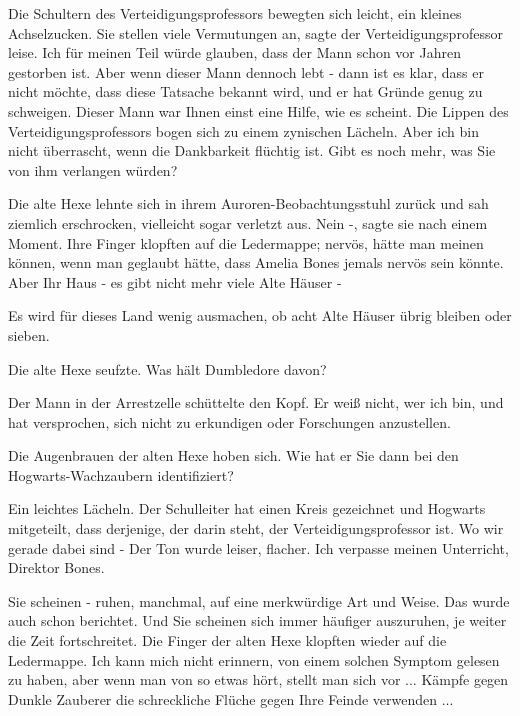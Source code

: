 Die Schultern des Verteidigungsprofessors bewegten sich leicht, ein kleines
Achselzucken. \glqq{}Sie stellen viele Vermutungen an\grqq{}, sagte der
Verteidigungsprofessor leise. \glqq{}Ich für meinen Teil würde glauben, dass der
Mann schon vor Jahren gestorben ist. Aber wenn dieser Mann dennoch lebt - dann
ist es klar, dass er nicht möchte, dass diese Tatsache bekannt wird, und er hat
Gründe genug zu schweigen. Dieser Mann war Ihnen einst eine Hilfe, wie es
scheint.\grqq{} Die Lippen des Verteidigungsprofessors bogen sich zu einem
zynischen Lächeln. \glqq{}Aber ich bin nicht überrascht, wenn die Dankbarkeit
flüchtig ist. Gibt es noch mehr, was Sie von ihm verlangen würden?\grqq{}

Die alte Hexe lehnte sich in ihrem Auroren-Beobachtungsstuhl zurück und sah
ziemlich erschrocken, vielleicht sogar verletzt aus. \glqq{}Nein -\grqq{}, sagte
sie nach einem Moment. Ihre Finger klopften auf die Ledermappe; nervös, hätte
man meinen können, wenn man geglaubt hätte, dass Amelia Bones jemals nervös sein
könnte. \glqq{}Aber Ihr Haus - es gibt nicht mehr viele Alte Häuser -\grqq{}

\glqq{}Es wird für dieses Land wenig ausmachen, ob acht Alte Häuser übrig bleiben
oder sieben.\grqq{}

Die alte Hexe seufzte. \glqq{}Was hält Dumbledore davon?\grqq{}

Der Mann in der Arrestzelle schüttelte den Kopf. \glqq{}Er weiß nicht, wer ich
bin, und hat versprochen, sich nicht zu erkundigen oder Forschungen
anzustellen.\grqq{}

Die Augenbrauen der alten Hexe hoben sich. \glqq{}Wie hat er Sie dann bei den
Hogwarts-Wachzaubern identifiziert?\grqq{}

Ein leichtes Lächeln. \glqq{}Der Schulleiter hat einen Kreis gezeichnet und
Hogwarts mitgeteilt, dass derjenige, der darin steht, der Verteidigungsprofessor
ist. Wo wir gerade dabei sind -\grqq{} Der Ton wurde leiser, flacher. \glqq{}Ich
verpasse meinen Unterricht, Direktor Bones.\grqq{}

\glqq{}Sie scheinen - ruhen, manchmal, auf eine merkwürdige Art und Weise. Das
wurde auch schon berichtet. Und Sie scheinen sich immer häufiger auszuruhen, je
weiter die Zeit fortschreitet.\grqq{} Die Finger der alten Hexe klopften wieder
auf die Ledermappe. \glqq{}Ich kann mich nicht erinnern, von einem solchen
Symptom gelesen zu haben, aber wenn man von so etwas hört, stellt man sich vor
... Kämpfe gegen Dunkle Zauberer die schreckliche Flüche gegen Ihre Feinde
verwenden ...\grqq{}

